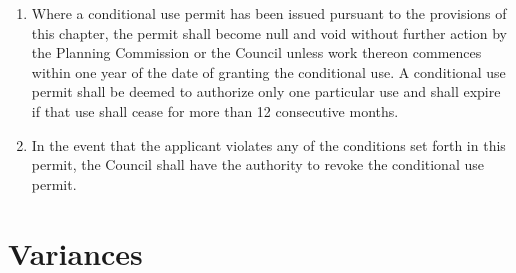 \begin{enumerate}[{\indent}1)]
    \item Where a conditional use permit has been issued pursuant to the provisions of this chapter, the permit shall become null and void without further action by the Planning Commission or the Council unless work thereon commences within one year of the date of granting the conditional use. A conditional use permit shall be deemed to authorize only one particular use and shall expire if that use shall cease for more than 12 consecutive months.
    \item In the event that the applicant violates any of the conditions set forth in this permit, the Council shall have the authority to revoke the conditional use permit.
\end{enumerate}
\section{Variances}
